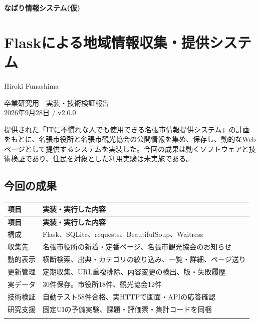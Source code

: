\documentclass[a4paper,10pt]{ltjsarticle}
\begin{document}
{\fontsize{25}{35}\selectfont\bfseries\sffamily\color{Blue}なばり情報システム(仮)\par}\vspace{8pt}

\section*{Flaskによる地域情報収集・提供システム}
Hiroki Funashima
\vspace{\fill}

卒業研究用　実装・技術検証報告\\
2026年9月28日 / v2.0.0
\clearpage


提供された「ITに不慣れな人でも使用できる名張市情報提供システム」の計画をもとに、名張市役所と名張市観光協会の公開情報を集め、保存し、動的なWebページとして提供するシステムを実装した。今回の成果は動くソフトウェアと技術検証であり、住民を対象とした利用実験は未実施である。


\subsection*{今回の成果}

{\small\begin{longtable}{@{}>{\raggedright\arraybackslash}p{}>{\raggedright\arraybackslash}p{}@{}}

\rowcolor{Pale}\textbf{項目} & \textbf{実装・実行した内容} \\ \midrule

\endfirsthead

\rowcolor{Pale}\textbf{項目} & \textbf{実装・実行した内容} \\ \midrule\endhead

構成 & Flask、SQLite、requests、BeautifulSoup、Waitress \\ \addlinespace[3pt]

収集先 & 名張市役所の新着・定番ページ、名張市観光協会のお知らせ \\ \addlinespace[3pt]

動的表示 & 横断検索、出典・カテゴリの絞り込み、一覧・詳細、ページ送り \\ \addlinespace[3pt]

更新管理 & 定期収集、URL重複排除、内容変更の検出、版・失敗履歴 \\ \addlinespace[3pt]

実データ & 30件保存。市役所18件、観光協会12件 \\ \addlinespace[3pt]

技術検証 & 自動テスト58件合格、実HTTPで画面・APIの応答確認 \\ \addlinespace[3pt]

研究支援 & 固定UIの予備実験、課題・評価票・集計コードを同梱 \\ \addlinespace[3pt]

\bottomrule\end{longtable}}
\end{document}
